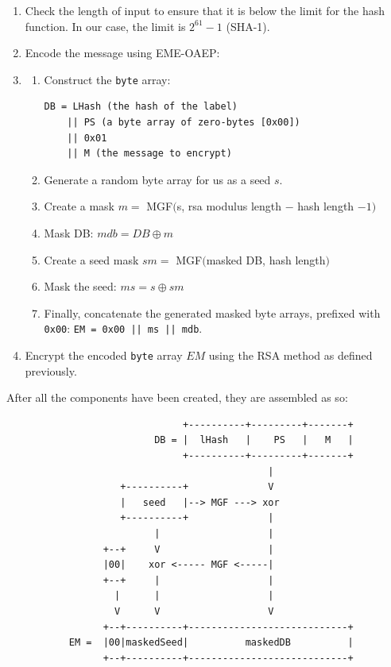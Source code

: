     \begin{enumerate}
      \item Check the length of input to ensure that it is below the limit for the hash function. In our case, the limit is $2^{61}-1$ (SHA-1).
      \item Encode the message using EME-OAEP:
      \item \begin{enumerate}
                  \item Construct the \verb!byte! array:
                  		\begin{verbatim}
DB = LHash (the hash of the label)
    || PS (a byte array of zero-bytes [0x00])
    || 0x01
    || M (the message to encrypt)
                            \end{verbatim}
                  \item Generate a random byte array for us as a seed $s$.
                  \item Create a mask $m = $ MGF$($s, rsa modulus length $-$ hash length $- 1)$
                  \item Mask DB: $mdb = DB \oplus m$
                  \item Create a seed mask $sm =  $ MGF$($masked DB, hash length$)$
                  \item Mask the seed: $ms = s \oplus sm$
                  \item Finally, concatenate the generated masked byte arrays, prefixed with \verb!0x00!:
                            \verb!EM = 0x00 || ms || mdb!.
                \end{enumerate}
      \item Encrypt the encoded \verb!byte! array $EM$ using the RSA method as defined previously.
    \end{enumerate}
    
    After all the components have been created, they are assembled as so\cite{Jonsson:2003aa}:
    
    \begin{minipage}[b]{0.5\linewidth}
      \small\begin{verbatim}
                               +----------+---------+-------+
                          DB = |  lHash   |    PS   |   M   |
                               +----------+---------+-------+
                                              |
                    +----------+              V
                    |   seed   |--> MGF ---> xor
                    +----------+              |
                          |                   |
                 +--+     V                   |
                 |00|    xor <----- MGF <-----|
                 +--+     |                   |
                   |      |                   |
                   V      V                   V
                 +--+----------+----------------------------+
           EM =  |00|maskedSeed|          maskedDB          |
                 +--+----------+----------------------------+
      \end{verbatim}
    \end{minipage}
    
